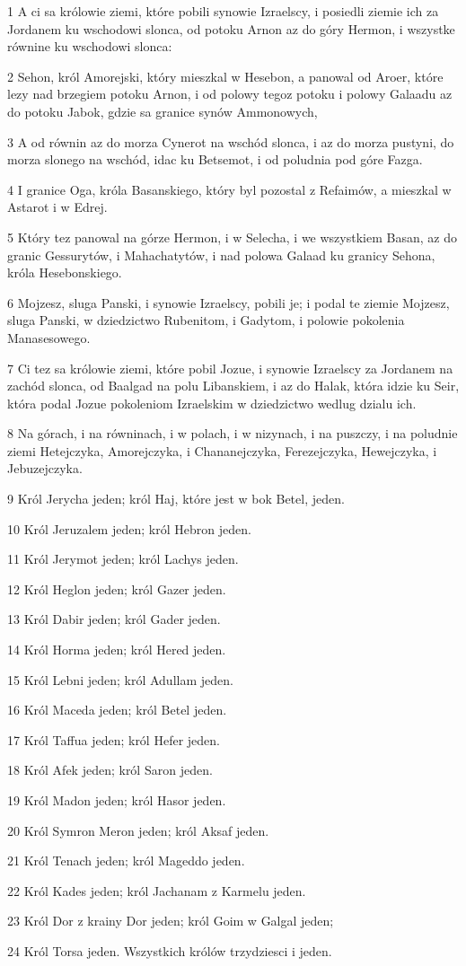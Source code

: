 \par 1 A ci sa królowie ziemi, które pobili synowie Izraelscy, i posiedli ziemie ich za Jordanem ku wschodowi slonca, od potoku Arnon az do góry Hermon, i wszystke równine ku wschodowi slonca:
\par 2 Sehon, król Amorejski, który mieszkal w Hesebon, a panowal od Aroer, które lezy nad brzegiem potoku Arnon, i od polowy tegoz potoku i polowy Galaadu az do potoku Jabok, gdzie sa granice synów Ammonowych,
\par 3 A od równin az do morza Cynerot na wschód slonca, i az do morza pustyni, do morza slonego na wschód, idac ku Betsemot, i od poludnia pod góre Fazga.
\par 4 I granice Oga, króla Basanskiego, który byl pozostal z Refaimów, a mieszkal w Astarot i w Edrej.
\par 5 Który tez panowal na górze Hermon, i w Selecha, i we wszystkiem Basan, az do granic Gessurytów, i Mahachatytów, i nad polowa Galaad ku granicy Sehona, króla Hesebonskiego.
\par 6 Mojzesz, sluga Panski, i synowie Izraelscy, pobili je; i podal te ziemie Mojzesz, sluga Panski, w dziedzictwo Rubenitom, i Gadytom, i polowie pokolenia Manasesowego.
\par 7 Ci tez sa królowie ziemi, które pobil Jozue, i synowie Izraelscy za Jordanem na zachód slonca, od Baalgad na polu Libanskiem, i az do Halak, która idzie ku Seir, która podal Jozue pokoleniom Izraelskim w dziedzictwo wedlug dzialu ich.
\par 8 Na górach, i na równinach, i w polach, i w nizynach, i na puszczy, i na poludnie ziemi Hetejczyka, Amorejczyka, i Chananejczyka, Ferezejczyka, Hewejczyka, i Jebuzejczyka.
\par 9 Król Jerycha jeden; król Haj, które jest w bok Betel, jeden.
\par 10 Król Jeruzalem jeden; król Hebron jeden.
\par 11 Król Jerymot jeden; król Lachys jeden.
\par 12 Król Heglon jeden; król Gazer jeden.
\par 13 Król Dabir jeden; król Gader jeden.
\par 14 Król Horma jeden; król Hered jeden.
\par 15 Król Lebni jeden; król Adullam jeden.
\par 16 Król Maceda jeden; król Betel jeden.
\par 17 Król Taffua jeden; król Hefer jeden.
\par 18 Król Afek jeden; król Saron jeden.
\par 19 Król Madon jeden; król Hasor jeden.
\par 20 Król Symron Meron jeden; król Aksaf jeden.
\par 21 Król Tenach jeden; król Mageddo jeden.
\par 22 Król Kades jeden; król Jachanam z Karmelu jeden.
\par 23 Król Dor z krainy Dor jeden; król Goim w Galgal jeden;
\par 24 Król Torsa jeden. Wszystkich królów trzydziesci i jeden.


